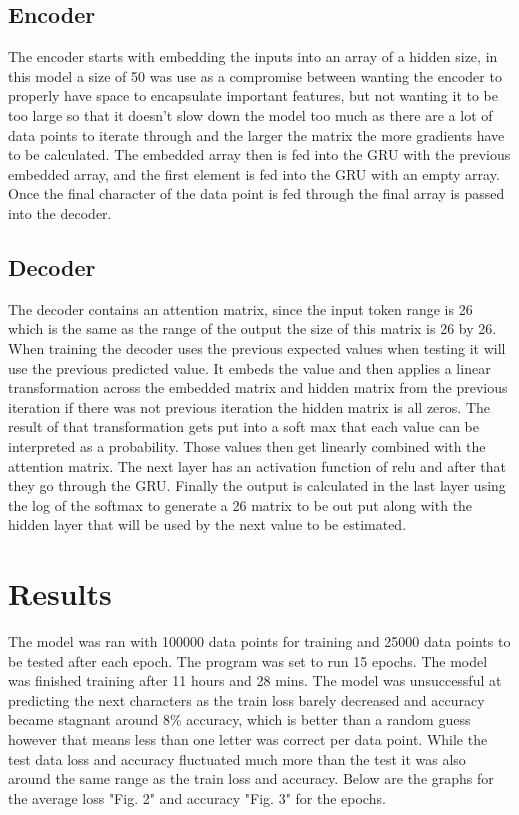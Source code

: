 \documentclass[conference]{IEEEtran}
\begin{document}
\subsection{Encoder}
The encoder starts with embedding the inputs into an array of a hidden size, in this model a size of 50 was use as a compromise between wanting the encoder to properly have space to encapsulate important features, but not wanting it to be too large so that it doesn't slow down the model too much as there are a lot of data points to iterate through and the larger the matrix the more gradients have to be calculated. The embedded array then is fed into the GRU with the previous embedded array, and the first element is fed into the GRU with an empty array. Once the final character of the data point is fed through the final array is passed into the decoder.
\subsection{Decoder}
The decoder contains an attention matrix, since the input token range is 26 which is the same as the range of the output the size of this matrix is 26 by 26. When training the decoder uses the previous expected values when testing it will use the previous predicted value. It embeds the value and then applies a linear transformation across the embedded matrix and hidden matrix from the previous iteration if there was not previous iteration the hidden matrix is all zeros. The result of that transformation gets put into a soft max that each value can be interpreted as a probability. Those values then get linearly combined with the attention matrix. The next layer has an activation function of relu and after that they go through the GRU. Finally the output is calculated in the last layer using the log of the softmax to generate a 26 matrix to be out put along with the hidden layer that will be used by the next value to be estimated.

\section{Results}

The model was ran with 100000 data points for training and 25000 data points to be tested after each epoch. The program was set to run 15 epochs. The model was finished training after 11 hours and 28 mins. The model was unsuccessful at predicting the next characters as the train loss barely decreased and accuracy became stagnant around 8\% accuracy, which is better than a random guess however that means less than one letter was correct per data point. While the test data loss and accuracy fluctuated much more than the test it was also around the same range as the train loss and accuracy. Below are the graphs for the average loss "Fig. 2" and accuracy "Fig. 3" for the epochs.
\end{document}
